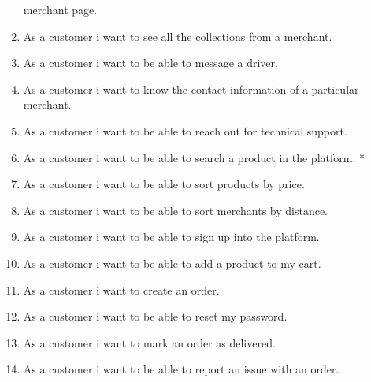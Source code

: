 \begin{enumerate}[resume, label=USR-\arabic*]
    merchant page.
    \item As a customer i want to see all the collections from a merchant.
    \item As a customer i want to be able to message a driver.
    \item As a customer i want to know the contact information of a 
    particular merchant.
    \item As a customer i want to be able to reach out for technical support.
    \item As a customer i want to be able to search a product in the platform. *
    \item As a customer i want to be able to sort products by price.
    \item As a customer i want to be able to sort merchants by distance.
    \item As a customer i want to be able to sign up into the platform.
    \item As a customer i want to be able to add a product to my cart.
    \item As a customer i want to create an order.
    \item As a customer i want to be able to reset my password.
    \item As a customer i want to mark an order as delivered.
    \item As a customer i want to be able to report an issue with an order.
\end{enumerate}
\pagebreak
